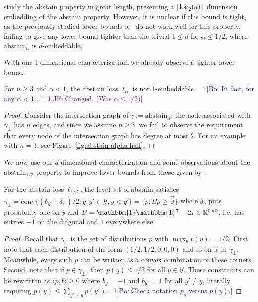 \documentclass[anon]{colt2020} %
\newcommand{\Comments}{1}
\newcommand{\mynote}[2]{\ifnum\Comments=1\textcolor{#1}{#2}\fi}
\newcommand{\jessie}[1]{\mynote{purple}{[JF: #1]}}
\newcommand{\bo}[1]{\mynote{blue}{[Bo: #1]}}
\newcommand{\reals}{\mathbb{R}}
\newcommand{\abstain}[1]{\mathrm{abstain}_{#1}}
\newcommand{\Y}{\mathcal{Y}}
\newcommand{\inprod}[2]{\langle #1, #2 \rangle}%
\newcommand{\conv}{\mathrm{conv}}
\newcommand{\ones}{\mathbbm{1}}
\DeclarePairedDelimiter\ceil{\lceil}{\rceil}
\begin{document}
\cite{ramaswamy2018consistent} study the abstain property in great length, presenting a $\ceil {\log_2(n)}$ dimension embedding of the abstain property.
However, it is unclear if this bound is tight, as the previously studied lower bounds of~\cite{ramaswamy2016convex} do not work well for this property, failing to give any lower bound tighter than the trivial $1 \leq d$ for $\alpha \leq 1/2$, where $\abstain{\alpha}$ is $d$-embeddable.

With our $1$-dimensional characterization, we already observe a tighter lower bound.
\begin{proposition}
	For $n \geq 3$ and $\alpha < 1$, the abstain loss $\ell_{\alpha}$ is not $1$-embeddable. \bo{In fact, for any $\alpha < 1$...}\jessie{Changed.  (Was $\alpha \leq 1/2$)}
\end{proposition}
\begin{proof}
	Consider the intersection graph of $\gamma := \abstain{\alpha}$: the node associated with $\gamma_\bot$ has $n$ edges, and since we assume $n \geq 3$, we fail to observe the requirement that every node of the intersection graph has degree at most $2$.
	For an example with $n=3$, see Figure~\ref{fig:abstain-alpha-half}.
\end{proof}

We now use our $d$-dimensional characterization and some observations about the $\abstain{1/2}$ property to improve lower bounds from those given by~\cite{ramaswamy2016convex}.

\begin{lemma} \label{lemma:abstain-v-h}
  For the abstain loss $\ell_{1/2}$, the level set of abstain satisfies $\gamma_{\bot} = \conv\{(\delta_y + \delta_{y'})/2 : y,y' \in \Y, y < y'\} = \{p : Bp \geq \vec{0}\}$ where $\delta_y$ puts probability one on $y$ and $B = \ones \ones^{\intercal} - 2I \in \reals^{5 \times 5}$, i.e. has entries $-1$ on the diagonal and $1$ everywhere else.
\end{lemma}
\begin{proof}
  Recall that $\gamma_{\bot}$ is the set of distributions $p$ with $\max_y p(y) = 1/2$.
  First, note that each distribution of the form $(1/2, 1/2, 0, 0, 0)$ and so on is in $\gamma_{\bot}$.
  Meanwhile, every such $p$ can be written as a convex combination of these corners.
  Second, note that if $p \in \gamma_{\bot}$, then $p(y) \leq 1/2$ for all $y \in \Y$.
  These constraints can be rewritten as $\inprod{p}{b} \geq 0$ where $b_y = -1$ and $b_{y'} = 1$ for all $y' \neq y$, literally requiring $p(y) \leq \sum_{y' \neq y} p(y')$.\bo{Check notation $p_y$ versus $p(y)$.}
\end{proof}
\end{document}
